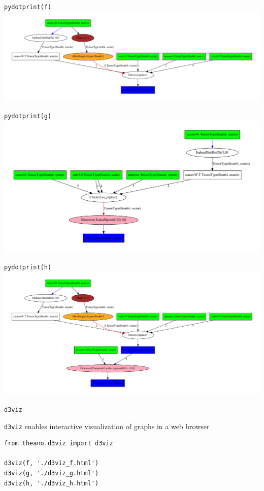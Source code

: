 \documentclass[a4paper,9pt]{beamer}
\begin{document}
\begin{frame}{\tt pydotprint(f)}
    \includegraphics[width=\textwidth]{pydotprint_f.pdf}
\end{frame}
\begin{frame}{\tt pydotprint(g)}
    \includegraphics[width=\textwidth]{pydotprint_g.pdf}
\end{frame}
\begin{frame}{\tt pydotprint(h)}
    \includegraphics[width=\textwidth]{pydotprint_h.pdf}
\end{frame}

\begin{frame}[fragile]{\tt d3viz}

{\tt d3viz} enables interactive visualization of graphs in a web browser

  \begin{verbatim}
from theano.d3viz import d3viz

d3viz(f, './d3viz_f.html')
d3viz(g, './d3viz_g.html')
d3viz(h, './d3viz_h.html')
  \end{verbatim}
\end{frame}
\end{document}
